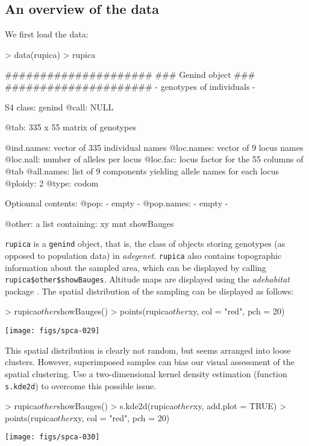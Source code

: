 \documentclass{article}
\begin{document}
\subsection{An overview of the data}
We first load the data:
\begin{Schunk}
\begin{Sinput}
> data(rupica)
> rupica
\end{Sinput}
\begin{Soutput}
   #####################
   ### Genind object ### 
   #####################
- genotypes of individuals - 

S4 class:  genind
@call: NULL

@tab:  335 x 55 matrix of genotypes

@ind.names: vector of  335 individual names
@loc.names: vector of  9 locus names
@loc.nall: number of alleles per locus
@loc.fac: locus factor for the  55 columns of @tab
@all.names: list of  9 components yielding allele names for each locus
@ploidy:  2
@type:  codom

Optionnal contents: 
@pop:  - empty -
@pop.names:  - empty -

@other: a list containing: xy  mnt  showBauges 
\end{Soutput}
\end{Schunk}
\texttt{rupica} is a \texttt{genind} object, that is, the class
of objects storing genotypes (as opposed to population data) in \textit{adegenet}.
\texttt{rupica} also contains topographic information about the
sampled area, which can be displayed by calling
\texttt{rupica\$other\$showBauges}.
Altitude maps are displayed using the \textit{adehabitat} package \cite{tj440}.
The spatial distribution of the sampling can be displayed as follows:
\begin{Schunk}
\begin{Sinput}
> rupica$other$showBauges()
> points(rupica$other$xy, col = "red", pch = 20)
\end{Sinput}
\end{Schunk}
\texttt{[image: figs/spca-029]}

\noindent This spatial distribution is clearly not random, but seems arranged into
loose clusters.
However, superimposed samples can bias our visual assessment of the spatial clustering.
Use a two-dimensional kernel density estimation (function \texttt{s.kde2d}) to overcome this possible
issue.
\begin{Schunk}
\begin{Sinput}
> rupica$other$showBauges()
> s.kde2d(rupica$other$xy, add.plot = TRUE)
> points(rupica$other$xy, col = "red", pch = 20)
\end{Sinput}
\end{Schunk}
\texttt{[image: figs/spca-030]}
\end{document}
